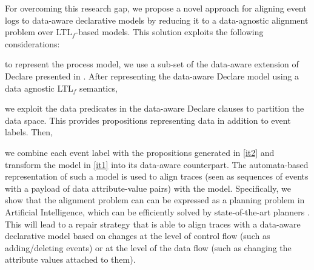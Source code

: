 
For overcoming this research gap, we propose a novel approach for aligning event logs to data-aware declarative models by reducing it to a data-agnostic alignment problem over LTL$_f$-based models. This solution exploits the following considerations: \begin{enumerate*}[label=\emph{\alph*})]
	\item \label{it1} to represent the process model, we use a sub-set of the data-aware extension of Declare presented in \cite{BurattinMS16}. After representing the data-aware Declare model using a data agnostic LTL$_f$ semantics,
	\item \label{it2} we exploit the data predicates in the data-aware Declare clauses to partition the data space. This provides propositions representing data in addition to event labels. Then,
	\item we combine each event label with the propositions generated in \ref{it2} and transform the model in \ref{it1} into its data-aware counterpart. The automata-based representation of such a model is used to align traces (seen as sequences of events with a payload of data attribute-value pairs) with the model. Specifically, we show that the alignment problem can can be expressed as a planning problem in Artificial Intelligence, which can be efficiently solved by state-of-the-art planners \cite{XuLZ17a,Marrella17}.
%
This will lead to a repair strategy that is able to align traces with a data-aware declarative model based on changes at the level of control flow (such as adding/deleting events) or at the level of the data flow (such as changing the attribute values attached to them).
\end{enumerate*}

